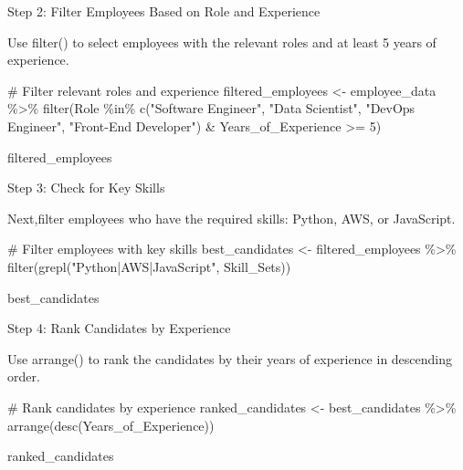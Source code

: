 \documentclass[
  11pt,
  a4paper]{article}
\newenvironment{Shaded}{\begin{snugshade}}{\end{snugshade}}
\newcommand{\CommentTok}[1]{\textcolor[rgb]{0.37,0.37,0.37}{#1}}
\newcommand{\DecValTok}[1]{\textcolor[rgb]{0.68,0.00,0.00}{#1}}
\newcommand{\FunctionTok}[1]{\textcolor[rgb]{0.28,0.35,0.67}{#1}}
\newcommand{\NormalTok}[1]{\textcolor[rgb]{0.00,0.23,0.31}{#1}}
\newcommand{\OtherTok}[1]{\textcolor[rgb]{0.00,0.23,0.31}{#1}}
\newcommand{\SpecialCharTok}[1]{\textcolor[rgb]{0.37,0.37,0.37}{#1}}
\newcommand{\StringTok}[1]{\textcolor[rgb]{0.13,0.47,0.30}{#1}}
\begin{document}
Step 2: Filter Employees Based on Role and Experience

Use filter() to select employees with the relevant roles and at least 5
years of experience.

\begin{Shaded}
\begin{Highlighting}[]
\CommentTok{\# Filter relevant roles and experience}
\NormalTok{filtered\_employees }\OtherTok{\textless{}{-}}\NormalTok{ employee\_data }\SpecialCharTok{\%\textgreater{}\%}
  \FunctionTok{filter}\NormalTok{(Role }\SpecialCharTok{\%in\%} \FunctionTok{c}\NormalTok{(}\StringTok{"Software Engineer"}\NormalTok{, }\StringTok{"Data Scientist"}\NormalTok{, }\StringTok{"DevOps Engineer"}\NormalTok{, }\StringTok{"Front{-}End Developer"}\NormalTok{) }\SpecialCharTok{\&}
\NormalTok{         Years\_of\_Experience }\SpecialCharTok{\textgreater{}=} \DecValTok{5}\NormalTok{)}

\NormalTok{filtered\_employees}
\end{Highlighting}
\end{Shaded}

Step 3: Check for Key Skills

Next,filter employees who have the required skills: Python, AWS, or
JavaScript.

\begin{Shaded}
\begin{Highlighting}[]
\CommentTok{\# Filter employees with key skills}
\NormalTok{best\_candidates }\OtherTok{\textless{}{-}}\NormalTok{ filtered\_employees }\SpecialCharTok{\%\textgreater{}\%}
  \FunctionTok{filter}\NormalTok{(}\FunctionTok{grepl}\NormalTok{(}\StringTok{"Python|AWS|JavaScript"}\NormalTok{, Skill\_Sets))}

\NormalTok{best\_candidates}
\end{Highlighting}
\end{Shaded}

Step 4: Rank Candidates by Experience

Use arrange() to rank the candidates by their years of experience in
descending order.

\begin{Shaded}
\begin{Highlighting}[]
\CommentTok{\# Rank candidates by experience}
\NormalTok{ranked\_candidates }\OtherTok{\textless{}{-}}\NormalTok{ best\_candidates }\SpecialCharTok{\%\textgreater{}\%}
  \FunctionTok{arrange}\NormalTok{(}\FunctionTok{desc}\NormalTok{(Years\_of\_Experience))}

\NormalTok{ranked\_candidates}
\end{Highlighting}
\end{Shaded}
\end{document}
